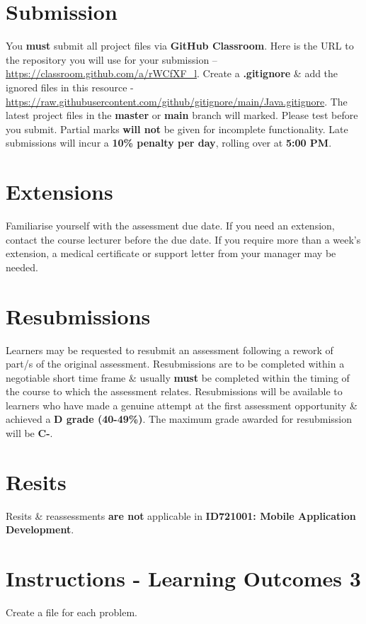\documentclass{article}
\begin{document}
\section*{Submission}
You \textbf{must} submit all project files via \textbf{GitHub Classroom}. Here is the URL to the repository you will use for your submission – \href{https://classroom.github.com/a/rWCfXF\_l}{https://classroom.github.com/a/rWCfXF\_l}.  Create a \textbf{.gitignore} \& add the ignored files in this resource - \href{https://raw.githubusercontent.com/github/gitignore/main/Java.gitignore}{https://raw.githubusercontent.com/github/gitignore/main/Java.gitignore}. The latest project files in the \textbf{master} or \textbf{main} branch will marked. Please test before you submit. Partial marks \textbf{will not} be given for incomplete functionality. Late submissions will incur a \textbf{10\% penalty per day}, rolling over at \textbf{5:00 PM}.

\section*{Extensions}
Familiarise yourself with the assessment due date. If you need an extension, contact the course lecturer before the due date. If you require more than a week's extension, a medical certificate or support letter from your manager may be needed.

\section*{Resubmissions}
Learners may be requested to resubmit an assessment following a rework of part/s of the original assessment. Resubmissions are to be completed within a negotiable short time frame \& usually \textbf{must} be completed within the timing of the course to which the assessment relates. Resubmissions will be available to learners who have made a genuine attempt at the first assessment opportunity \& achieved a \textbf{D grade (40-49\%)}. The maximum grade awarded for resubmission will be \textbf{C-}.

\section*{Resits}
Resits \& reassessments \textbf{are not} applicable in \textbf{ID721001: Mobile Application Development}.

\section*{Instructions - Learning Outcomes 3}
Create a file for each problem.
\end{document}
